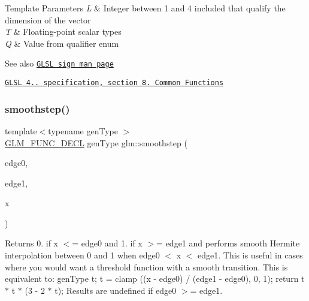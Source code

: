 \begin{DoxyTemplParams}{Template Parameters}
{\em L} & Integer between 1 and 4 included that qualify the dimension of the vector \\
\hline
{\em T} & Floating-\/point scalar types \\
\hline
{\em Q} & Value from qualifier enum\\
\hline
\end{DoxyTemplParams}
\begin{DoxySeeAlso}{See also}
\href{http://www.opengl.org/sdk/docs/manglsl/xhtml/sign.xml}{\tt G\+L\+SL sign man page} 

\href{http://www.opengl.org/registry/doc/GLSLangSpec.4.20.8.pdf}{\tt G\+L\+SL 4.. specification, section 8. Common Functions} 
\end{DoxySeeAlso}
\mbox{\label{group__core__func__common_ga562edf7eca082cc5b7a0aaf180436daf}} 
\subsubsection{\texorpdfstring{smoothstep()}{smoothstep()}\hspace{0.1cm}{\footnotesize\ttfamily [1/3]}}
{\footnotesize\ttfamily template$<$typename gen\+Type $>$ \\
\hyperlink{setup_8hpp_ab2d052de21a70539923e9bcbf6e83a51}{G\+L\+M\+\_\+\+F\+U\+N\+C\+\_\+\+D\+E\+CL} gen\+Type glm\+::smoothstep (\begin{DoxyParamCaption}\item[{gen\+Type}]{edge0,  }\item[{gen\+Type}]{edge1,  }\item[{gen\+Type}]{x }\end{DoxyParamCaption})}

Returns 0. if x $<$= edge0 and 1. if x $>$= edge1 and performs smooth Hermite interpolation between 0 and 1 when edge0 $<$ x $<$ edge1. This is useful in cases where you would want a threshold function with a smooth transition. This is equivalent to\+: gen\+Type t; t = clamp ((x -\/ edge0) / (edge1 -\/ edge0), 0, 1); return t $\ast$ t $\ast$ (3 -\/ 2 $\ast$ t); Results are undefined if edge0 $>$= edge1.


